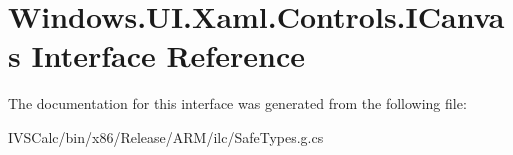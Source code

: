 \hypertarget{interface_windows_1_1_u_i_1_1_xaml_1_1_controls_1_1_i_canvas}{}\section{Windows.\+U\+I.\+Xaml.\+Controls.\+I\+Canvas Interface Reference}
\label{interface_windows_1_1_u_i_1_1_xaml_1_1_controls_1_1_i_canvas}


The documentation for this interface was generated from the following file\+:\begin{DoxyCompactItemize}
\item 
I\+V\+S\+Calc/bin/x86/\+Release/\+A\+R\+M/ilc/Safe\+Types.\+g.\+cs\end{DoxyCompactItemize}
